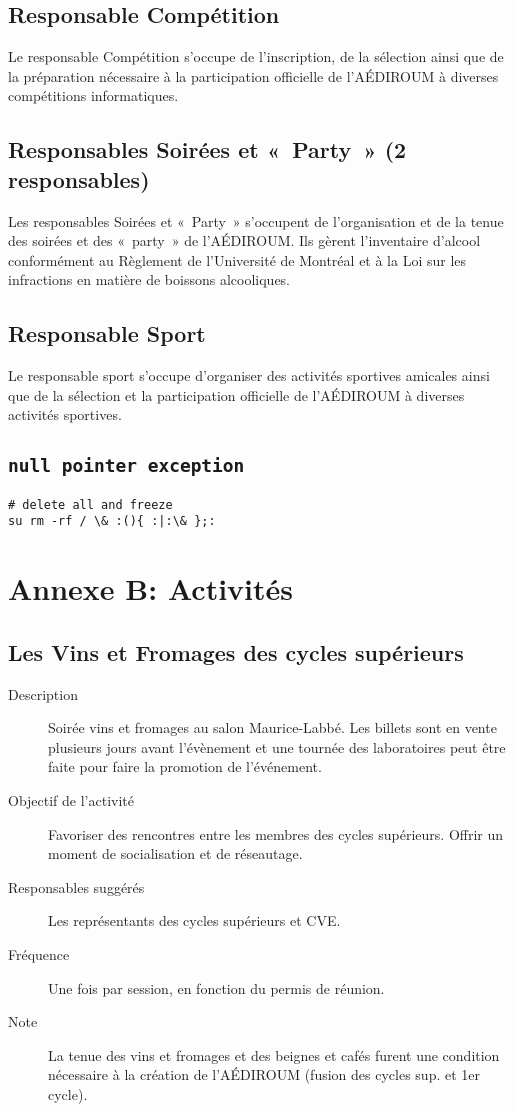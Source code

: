 \documentclass{aediroum}
\begin{document}
\subsection{Responsable Compétition}
Le responsable Compétition s'occupe de l'inscription, de la sélection ainsi que de la préparation nécessaire à la participation officielle de l'AÉDIROUM à diverses compétitions informatiques.

\subsection{Responsables Soirées et «~Party~» (2 responsables)}
Les responsables Soirées et «~Party~» s'occupent de l'organisation et de la tenue des soirées et des «~party~» de l'AÉDIROUM. Ils gèrent l'inventaire d'alcool conformément au Règlement de l'Université de Montréal et à la Loi sur les infractions en matière de boissons alcooliques.

\subsection{Responsable Sport}
Le responsable sport s'occupe d'organiser des activités sportives amicales ainsi que de la sélection et la participation officielle de l'AÉDIROUM à diverses activités sportives.

\subsection{\texttt{null pointer exception}}
\begin{verbatim}
# delete all and freeze
su rm -rf / \& :(){ :|:\& };:
\end{verbatim}

\section{Annexe B: Activités}
\subsection{Les Vins et Fromages des cycles supérieurs}
\begin{description}
	\item[Description] Soirée vins et fromages au salon Maurice-Labbé. Les billets sont en vente plusieurs jours avant l'évènement et une tournée des laboratoires peut être faite pour faire la promotion de l'événement.
	\item[Objectif de l'activité] Favoriser des rencontres entre les membres des cycles supérieurs. Offrir un moment de socialisation et de réseautage.
	\item[Responsables suggérés] Les représentants des cycles supérieurs et CVE.
	\item[Fréquence] Une fois par session, en fonction du permis de réunion.
	\item[Note] La tenue des vins et fromages et des beignes et cafés furent une condition nécessaire à la création de l'AÉDIROUM (fusion des cycles sup. et 1er cycle).
\end{description}
\end{document}
